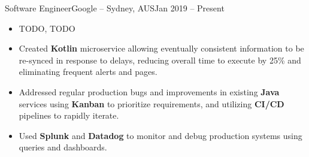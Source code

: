 \begin{cvsubsection}{Software Engineer}{Google -- Sydney, AUS}{Jan 2019 -- Present}
	\begin{itemize}
		\item TODO, TODO
		\item Created \textbf{Kotlin} microservice allowing eventually consistent information to be re-synced in response to delays, reducing overall time to execute by 25\% and eliminating frequent alerts and pages.
		\item Addressed regular production bugs and improvements in existing \textbf{Java} services using \textbf{Kanban} to prioritize requirements, and utilizing \textbf{CI/CD} pipelines to rapidly iterate.
		\item Used \textbf{Splunk} and \textbf{Datadog} to monitor and debug production systems using queries and dashboards.
	\end{itemize}
\end{cvsubsection}